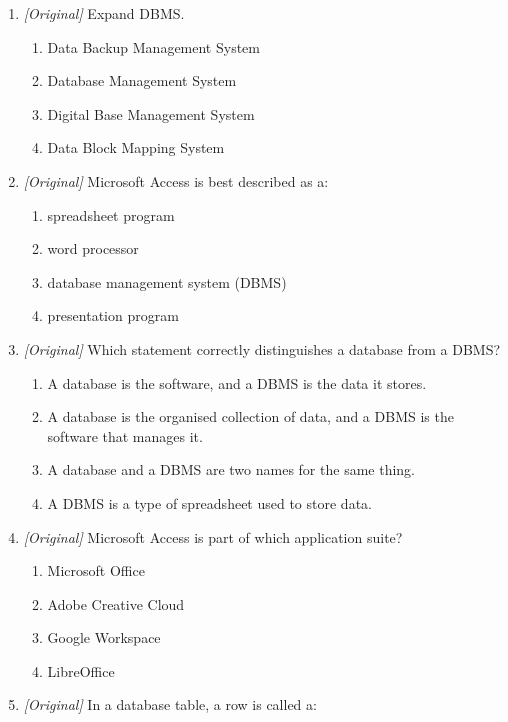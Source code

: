 \begin{enumerate}[label=\textbf{Q\arabic*.}, leftmargin=*]
\item \textit{[Original]} Expand DBMS.
  \begin{enumerate}[label=\Alph*.]
    \item Data Backup Management System
    \item Database Management System
    \item Digital Base Management System
    \item Data Block Mapping System
  \end{enumerate}
\item \textit{[Original]} Microsoft Access is best described as a:
  \begin{enumerate}[label=\Alph*.]
    \item spreadsheet program
    \item word processor
    \item database management system (DBMS)
    \item presentation program
  \end{enumerate}
\item \textit{[Original]} Which statement correctly distinguishes a database
  from a DBMS?
  \begin{enumerate}[label=\Alph*.]
    \item A database is the software, and a DBMS is the data it stores.
    \item A database is the organised collection of data, and a DBMS is the
      software that manages it.
    \item A database and a DBMS are two names for the same thing.
    \item A DBMS is a type of spreadsheet used to store data.
  \end{enumerate}
\item \textit{[Original]} Microsoft Access is part of which application suite?
  \begin{enumerate}[label=\Alph*.]
    \item Microsoft Office
    \item Adobe Creative Cloud
    \item Google Workspace
    \item LibreOffice
  \end{enumerate}
\item \textit{[Original]} In a database table, a row is called a:
  \begin{enumerate}[label=\Alph*.]

\end{enumerate}
\end{enumerate}
